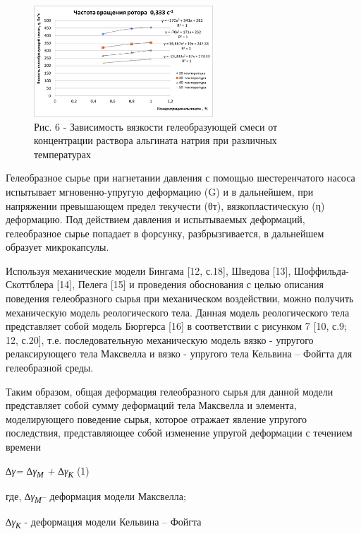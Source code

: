 \begin{figure}[H]
	\centering
	\includegraphics[width=0.6\textwidth]{assets/315}
	\caption*{Рис. 6 - Зависимость вязкости гелеобразующей смеси от
	концентрации раствора альгината натрия при различных температурах}
\end{figure}


\begin{multicols}{2}

Гелеобразное сырье при нагнетании давления с помощью шестеренчатого
насоса испытывает мгновенно-упругую деформацию (G) и в дальнейшем, при
напряжении превышающем предел текучести (θт), вязкопластическую (η)
деформацию. Под действием давления и испытываемых деформаций,
гелеобразное сырье попадает в форсунку, разбрызгивается, в дальнейшем
образует микрокапсулы.

Используя механические модели Бингама {[}12, с.18{]}, Шведова {[}13{]},
Шоффильда-Скоттблера {[}14{]}, Пелега {[}15{]} и проведения обоснования
с целью описания поведения гелеобразного сырья при механическом
воздействии, можно получить механическую модель реологического тела.
Данная модель реологического тела представляет собой модель Бюргерса
{[}16{]} в соответствии с рисунком 7 {[}10, с.9; 12, с.20{]}, т.е.
последовательную механическую модель вязко - упругого релаксирующего
тела Максвелла и вязко - упругого тела Кельвина -- Фойгта для
гелеобразной среды.

Таким образом, общая деформация гелеобразного сырья для данной модели
представляет собой сумму деформаций тела Максвелла и элемента,
моделирующего поведение сырья, которое отражает явление упругого
последствия, представляющее собой изменение упругой деформации с
течением времени


	\emph{∆γ= ∆γ\textsubscript{М} + ∆γ\textsubscript{К} }    (1)


где, \emph{∆γ\textsubscript{М}}-- деформация модели Максвелла;

\emph{∆γ\textsubscript{К}} - деформация модели Кельвина -- Фойгта
\end{multicols}

